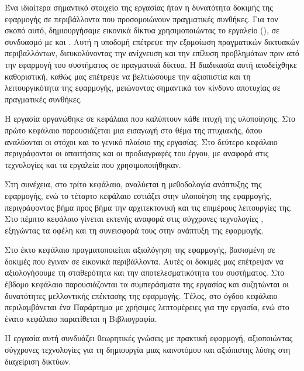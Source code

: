 Ένα ιδιαίτερα σημαντικό στοιχείο της εργασίας ήταν η δυνατότητα 
δοκιμής της εφαρμογής σε περιβάλλοντα που προσομοιώνουν 
πραγματικές συνθήκες. Για τον σκοπό αυτό, δημιουργήσαμε εικονικά 
δίκτυα χρησιμοποιώντας το εργαλείο  (), 
σε συνδυασμό με  και . 
Αυτή η υποδομή επέτρεψε την εξομοίωση πραγματικών δικτυακών 
περιβαλλόντων, διευκολύνοντας την ανίχνευση και την επίλυση 
προβλημάτων πριν από την εφαρμογή του συστήματος σε πραγματικά δίκτυα. 
Η διαδικασία αυτή αποδείχθηκε καθοριστική, καθώς μας επέτρεψε να βελτιώσουμε την αξιοπιστία και τη λειτουργικότητα της εφαρμογής, μειώνοντας σημαντικά τον κίνδυνο αποτυχίας σε πραγματικές συνθήκες.

Η εργασία οργανώθηκε σε κεφάλαια που καλύπτουν κάθε πτυχή της 
υλοποίησης. Στο πρώτο κεφάλαιο παρουσιάζεται μια εισαγωγή 
στο θέμα της πτυχιακής, όπου αναλύονται οι στόχοι και το γενικό 
πλαίσιο της εργασίας. Στο δεύτερο κεφάλαιο περιγράφονται οι 
απαιτήσεις και οι προδιαγραφές του έργου, με αναφορά στις 
τεχνολογίες και τα εργαλεία που χρησιμοποιήθηκαν.

Στη συνέχεια, στο τρίτο κεφάλαιο, αναλύεται η 
μεθοδολογία ανάπτυξης της εφαρμογής, ενώ το τέταρτο κεφάλαιο εστιάζει 
στην υλοποίηση της εφαρμογής, περιγράφοντας βήμα προς βήμα την 
αρχιτεκτονική και τις επιμέρους λειτουργίες της. Στο πέμπτο κεφάλαιο 
γίνεται εκτενής αναφορά στις σύγχρονες τεχνολογίες , 
εξηγώντας τα οφέλη και τη συνεισφορά τους στην ανάπτυξη της εφαρμογής.

Στο έκτο κεφάλαιο πραγματοποιείται αξιολόγηση της εφαρμογής, 
βασισμένη σε δοκιμές που έγιναν σε εικονικά περιβάλλοντα. 
Αυτές οι δοκιμές μας επέτρεψαν να αξιολογήσουμε τη σταθερότητα και 
την αποτελεσματικότητα του συστήματος. Στο έβδομο κεφάλαιο παρουσιάζονται 
τα συμπεράσματα της εργασίας και συζητώνται οι δυνατότητες μελλοντικής 
επέκτασης της εφαρμογής. Τέλος, στο όγδοο κεφάλαιο περιλαμβάνεται ένα 
Παράρτημα με χρήσιμες λεπτομέρειες για την εργασία, ενώ στο ένατο 
κεφάλαιο παρατίθεται η Βιβλιογραφία.

Η εργασία αυτή συνδυάζει θεωρητικές γνώσεις με πρακτική εφαρμογή, 
αξιοποιώντας σύγχρονες τεχνολογίες για τη δημιουργία μιας καινοτόμου 
και αξιόπιστης λύσης στη διαχείριση δικτύων. 
